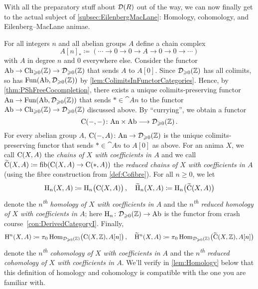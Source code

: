 With all the preparatory stuff about $\mathcal{D}(R)$ out of the way, we can now finally get to the actual subject of \cref{subsec:EilenbergMacLane}: Homology, cohomology, and Eilenberg--MacLane animae.
\begin{con}\label{con:Homology}
	For all integers $n$ and all abelian groups $A$ define a chain complex
	\begin{equation*}
		A[n]_*\coloneqq \left(\dotsb\rightarrow 0\rightarrow 0\rightarrow A\rightarrow 0\rightarrow 0\rightarrow \dotsb\right)
	\end{equation*}
	with $A$ in degree $n$ and $0$ everywhere else. Consider the functor $\mathrm{Ab}\rightarrow\operatorname{Ch}_{\geqslant 0}(\mathbb{Z})\rightarrow\mathcal{D}_{\geqslant 0}(\mathbb{Z})$ that sends $A$ to $A[0]$. Since $\mathcal{D}_{\geqslant 0}(\mathbb{Z})$ has all colimits, so has $\operatorname{Fun}(\mathrm{Ab},\mathcal{D}_{\geqslant 0}(\mathbb{Z}))$ by \cref{lem:ColimitsInFunctorCategories}. Hence, by \cref{thm:PShFreeCocompletion}, there exists a unique colimits-preserving functor $\mathrm{An}\rightarrow\operatorname{Fun}(\mathrm{Ab},\mathcal{D}_{\geqslant 0}(\mathbb{Z}))$ that sends $*\in\cat{An}$ to the functor $\mathrm{Ab}\rightarrow\operatorname{Ch}_{\geqslant 0}(\mathbb{Z})\rightarrow\mathcal{D}_{\geqslant 0}(\mathbb{Z})$ discussed above. By \enquote{currying}, we obtain a functor
	\begin{equation*}
		\operatorname{C}(-,-)\colon \mathrm{An}\times\mathrm{Ab}\longrightarrow \mathcal{D}_{\geqslant 0}(\mathbb{Z})\,.
	\end{equation*} 
	For every abelian group $A$, $\operatorname{C}(-,A)\colon \mathrm{An}\rightarrow\mathcal{D}_{\geqslant 0}(\mathbb{Z})$ is the unique colimits-preserving functor that sends $*\in\cat{An}$ to $A[0]$ as above. For an anima $X$, we call $\operatorname{C}(X,A)$ the \emph{chains of $X$ with coefficients in $A$} and we call $\widetilde{\operatorname{C}}(X,A)\coloneqq \operatorname{fib}(\operatorname{C}(X,A)\rightarrow\operatorname{C}(*,A))$ the \emph{reduced chains of $X$ with coefficients in $A$} (using the fibre construction from \cref{def:Cofibre}). For all $n\geqslant 0$, we let
	\begin{equation*}
		\mathrm{H}_n(X,A)\coloneqq \mathrm{H}_n\bigl(\operatorname{C}(X,A)\bigr)\,,\quad \widetilde{\mathrm{H}}_n(X,A)\coloneqq\mathrm{H}_n\bigl(\widetilde{\operatorname{C}}(X,A)\bigr)
	\end{equation*}
	denote the \emph{$n$\textsuperscript{th} homology of $X$ with coefficients in $A$} and the \emph{$n$\textsuperscript{th} reduced homology of $X$ with coefficients in $A$}; here $\mathrm{H}_n\colon \mathcal{D}_{\geqslant 0}(\mathbb{Z})\rightarrow\mathrm{Ab}$ is the functor from crash course~\cref{con:DerivedCategoryI}. Finally,
	\begin{equation*}
		\mathrm{H}^n(X,A)\coloneqq \pi_0\operatorname{Hom}_{\mathcal{D}_{\geqslant 0}(\mathbb{Z})}\bigl(\operatorname{C}(X,\mathbb{Z}),A[n]\bigr)\,,\quad\widetilde{\mathrm{H}}^n(X,A)\coloneqq \pi_0\operatorname{Hom}_{\mathcal{D}_{\geqslant 0}(\mathbb{Z})}\bigl(\widetilde{\operatorname{C}}(X,\mathbb{Z}),A[n]\bigr)
	\end{equation*}
	denote the \emph{$n$\textsuperscript{th} cohomology of $X$ with coefficients in $A$} and the \emph{$n$\textsuperscript{th} reduced cohomology of $X$ with coefficients in $A$}. We'll verify in \cref{lem:Homology} below that this definition of homology and cohomology is compatible with the one you are familiar with.
	

\end{con}
